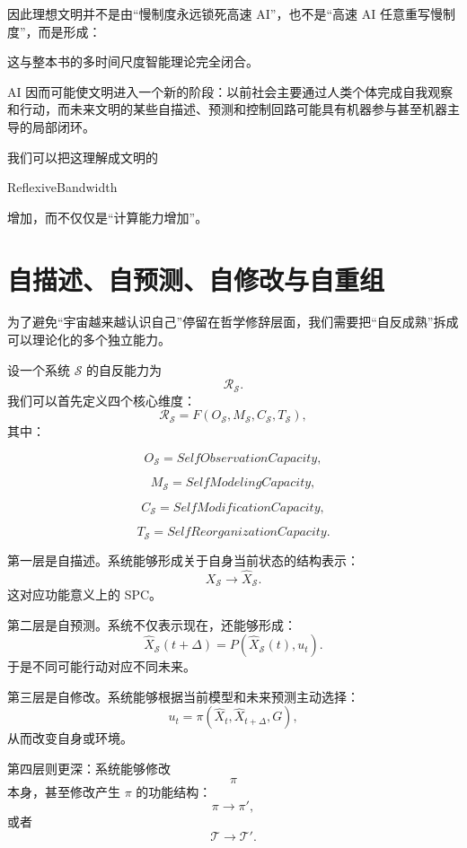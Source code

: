 因此理想文明并不是由“慢制度永远锁死高速 AI”，也不是“高速 AI 任意重写慢制度”，而是形成：
\begin{statementbox}
\centering
{}
\end{statementbox}

这与整本书的多时间尺度智能理论完全闭合。

AI 因而可能使文明进入一个新的阶段：以前社会主要通过人类个体完成自我观察和行动，而未来文明的某些自描述、预测和控制回路可能具有机器参与甚至机器主导的局部闭环。

我们可以把这理解成文明的
\begin{statementbox}
ReflexiveBandwidth
\end{statementbox}
增加，而不仅仅是“计算能力增加”。


\section{自描述、自预测、自修改与自重组}

为了避免“宇宙越来越认识自己”停留在哲学修辞层面，我们需要把“自反成熟”拆成可以理论化的多个独立能力。

设一个系统 $\mathcal{S}$ 的自反能力为
\[
\mathcal{R}_{\mathcal S}.
\]
我们可以首先定义四个核心维度：
\[
\mathcal{R}_{\mathcal S}
=
F(
O_{\mathcal S},
M_{\mathcal S},
C_{\mathcal S},
T_{\mathcal S}
),
\]
其中：

\[
O_{\mathcal S}
=
SelfObservationCapacity,
\]

\[
M_{\mathcal S}
=
SelfModelingCapacity,
\]

\[
C_{\mathcal S}
=
SelfModificationCapacity,
\]

\[
T_{\mathcal S}
=
SelfReorganizationCapacity.
\]

第一层是自描述。系统能够形成关于自身当前状态的结构表示：
\[
X_{\mathcal S}
\rightarrow
\hat X_{\mathcal S}.
\]
这对应功能意义上的 SPC。

第二层是自预测。系统不仅表示现在，还能够形成：
\[
\hat X_{\mathcal S}(t+\Delta)
=
P(
\hat X_{\mathcal S}(t),
u_t
).
\]
于是不同可能行动对应不同未来。

第三层是自修改。系统能够根据当前模型和未来预测主动选择：
\[
u_t
=
\pi(
\hat X_t,
\hat X_{t+\Delta},
G
),
\]
从而改变自身或环境。

第四层则更深：系统能够修改
\[
\pi
\]
本身，甚至修改产生 $\pi$ 的功能结构：
\[
\pi
\rightarrow
\pi',
\]
或者
\[
\mathcal T
\rightarrow
\mathcal T'.
\]

